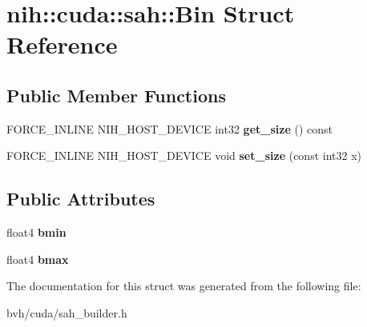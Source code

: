 \hypertarget{structnih_1_1cuda_1_1sah_1_1_bin}{
\section{nih\-:\-:cuda\-:\-:sah\-:\-:\-Bin \-Struct \-Reference}
\label{structnih_1_1cuda_1_1sah_1_1_bin}
}
\subsection*{\-Public \-Member \-Functions}
\begin{DoxyCompactItemize}
\item 
\hypertarget{structnih_1_1cuda_1_1sah_1_1_bin_aac3e8bb400330e915986fe215f2c0355}{
\-F\-O\-R\-C\-E\-\_\-\-I\-N\-L\-I\-N\-E \-N\-I\-H\-\_\-\-H\-O\-S\-T\-\_\-\-D\-E\-V\-I\-C\-E int32 {\bfseries get\-\_\-size} () const }
\label{structnih_1_1cuda_1_1sah_1_1_bin_aac3e8bb400330e915986fe215f2c0355}

\item 
\hypertarget{structnih_1_1cuda_1_1sah_1_1_bin_ac5a3567f77045dd99027256a9b1e157a}{
\-F\-O\-R\-C\-E\-\_\-\-I\-N\-L\-I\-N\-E \-N\-I\-H\-\_\-\-H\-O\-S\-T\-\_\-\-D\-E\-V\-I\-C\-E void {\bfseries set\-\_\-size} (const int32 x)}
\label{structnih_1_1cuda_1_1sah_1_1_bin_ac5a3567f77045dd99027256a9b1e157a}

\end{DoxyCompactItemize}
\subsection*{\-Public \-Attributes}
\begin{DoxyCompactItemize}
\item 
\hypertarget{structnih_1_1cuda_1_1sah_1_1_bin_a813bd78869dbaca446fc674e1b4a2372}{
float4 {\bfseries bmin}}
\label{structnih_1_1cuda_1_1sah_1_1_bin_a813bd78869dbaca446fc674e1b4a2372}

\item 
\hypertarget{structnih_1_1cuda_1_1sah_1_1_bin_ac7d0ca8b94ca9fda5f46f50ecf006ce7}{
float4 {\bfseries bmax}}
\label{structnih_1_1cuda_1_1sah_1_1_bin_ac7d0ca8b94ca9fda5f46f50ecf006ce7}

\end{DoxyCompactItemize}


\-The documentation for this struct was generated from the following file\-:\begin{DoxyCompactItemize}
\item 
bvh/cuda/sah\-\_\-builder.\-h\end{DoxyCompactItemize}
